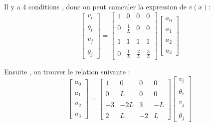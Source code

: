 \documentclass[a4paper,10pt]{report} %
\begin{document}
Il y a 4 conditions  , donc on peut camculer la expression de $v(x)$:
\[ 
\left[ \begin{array}{c}v_i\\\\\theta_i\\\\v_j\\\\\theta_j\end{array} \right]
=\left[ \begin{array}{cccc}
1 & 0 & 0 & 0  \\\\
0 & \frac{1}{L} & 0 & 0 \\\\
1 & 1 &1 &1 \\\\
0 & \frac{1}{L} &\frac{2}{L} &\frac{3}{L} 
\end{array} \right]
\left[ \begin{array}{c}a_0\\\\a_1\\\\a_2\\\\a_3\end{array} \right]
\]

Ensuite , on trouver le relation suivante :
\[ 
\left[ \begin{array}{c}a_0\\\\a_1\\\\a_2\\\\a_3\end{array} \right]
=\left[ \begin{array}{cccc}
1 & 0 & 0 & 0  \\\\
0 & L & 0 & 0 \\\\
-3 & -2L &3 &-L \\\\
2 & L & -2 &L
\end{array} \right]
\left[ \begin{array}{c}v_i\\\\\theta_i\\\\v_j\\\\\theta_j\end{array} \right]
\]
\end{document}
